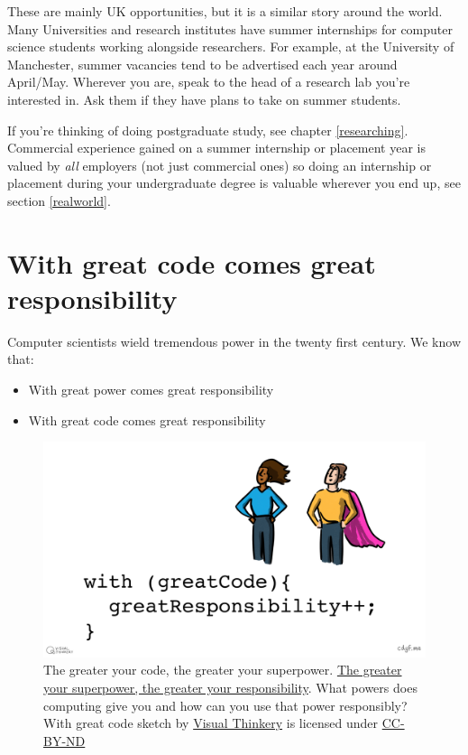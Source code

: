 \documentclass[
]{book}
\providecommand{\tightlist}{%
  \setlength{\itemsep}{0pt}\setlength{\parskip}{0pt}}
\begin{document}
These are mainly UK opportunities, but it is a similar story around the world. Many Universities and research institutes have summer internships for computer science students working alongside researchers. For example, at the University of Manchester, summer vacancies tend to be advertised each year around April/May. Wherever you are, speak to the head of a research lab you're interested in. Ask them if they have plans to take on summer students.

If you're thinking of doing postgraduate study, see chapter \ref{researching}. Commercial experience gained on a summer internship or placement year is valued by \emph{all} employers (not just commercial ones) so doing an internship or placement during your undergraduate degree is valuable wherever you end up, see section \ref{realworld}.

\hypertarget{peterparker}{%
\section{With great code comes great responsibility}\label{peterparker}}

Computer scientists wield tremendous power in the twenty first century. We know that:

\begin{itemize}
\tightlist
\item
  With great power comes great responsibility \citep{spiderman}
\item
  With great code comes great responsibility \citep{responsiblecs}
\end{itemize}

\begin{figure}

{\centering \includegraphics[width=1\linewidth]{images/With great code} 

}

\caption{The greater your code, the greater your superpower. \href{https://en.wikipedia.org/wiki/With_great_power_comes_great_responsibility}{The greater your superpower, the greater your responsibility}. What powers does computing give you and how can you use that power responsibly? \citep{Shapiro2021} With great code sketch by \href{https://visualthinkery.com/}{Visual Thinkery} is licensed under \href{https://creativecommons.org/licenses/by-nd/4.0/}{CC-BY-ND}}\label{fig:spiderman-fig}
\end{figure}
\end{document}
